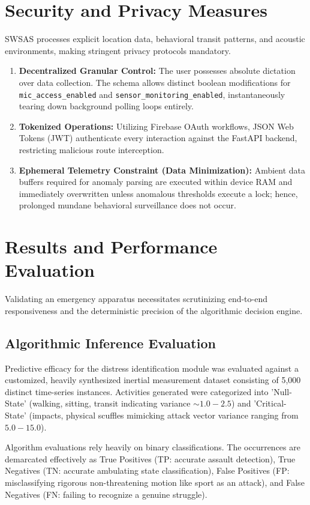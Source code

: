 \documentclass[10pt,journal,compsoc]{IEEEtran}
\begin{document}
\section{Security and Privacy Measures}
SWSAS processes explicit location data, behavioral transit patterns, and acoustic environments, making stringent privacy protocols mandatory.
\begin{enumerate}
    \item \textbf{Decentralized Granular Control:} The user possesses absolute dictation over data collection. The schema allows distinct boolean modifications for \texttt{mic\_access\_enabled} and \texttt{sensor\_monitoring\_enabled}, instantaneously tearing down background polling loops entirely.
    \item \textbf{Tokenized Operations:} Utilizing Firebase OAuth workflows, JSON Web Tokens (JWT) authenticate every interaction against the FastAPI backend, restricting malicious route interception.
    \item \textbf{Ephemeral Telemetry Constraint (Data Minimization):} Ambient data buffers required for anomaly parsing are executed within device RAM and immediately overwritten unless anomalous thresholds execute a lock; hence, prolonged mundane behavioral surveillance does not occur.
\end{enumerate}

\section{Results and Performance Evaluation}
Validating an emergency apparatus necessitates scrutinizing end-to-end responsiveness and the deterministic precision of the algorithmic decision engine.

\subsection{Algorithmic Inference Evaluation}
Predictive efficacy for the distress identification module was evaluated against a customized, heavily synthesized inertial measurement dataset consisting of 5,000 distinct time-series instances. Activities generated were categorized into 'Null-State' (walking, sitting, transit indicating variance $\sim 1.0-2.5$) and 'Critical-State' (impacts, physical scuffles mimicking attack vector variance ranging from $5.0-15.0$).

Algorithm evaluations rely heavily on binary classifications. The occurrences are demarcated effectively as True Positives (TP: accurate assault detection), True Negatives (TN: accurate ambulating state classification), False Positives (FP: misclassifying rigorous non-threatening motion like sport as an attack), and False Negatives (FN: failing to recognize a genuine struggle).
\end{document}
